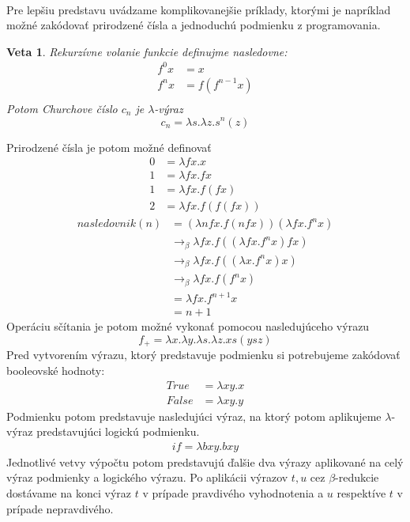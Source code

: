\documentclass[a4paper,10pt,oneside]{report}%
\newtheorem{theorem}{Veta}[chapter]
\begin{document}
~\\
    Pre lepšiu predstavu uvádzame komplikovanejšie príklady, ktorými je napríklad 
možné zakódovať prirodzené čísla a jednoduchú podmienku z programovania.
\begin{theorem}
    Rekurzívne volanie funkcie definujme nasledovne:
    \begin{align*}
        f^{0}x &= x \\
        f^{n}x &= f(f^{n-1}x) \\
    \end{align*}
    Potom Churchove číslo $c_{n}$ je $\lambda$-výraz
    \begin{equation*}
        c_{n} = \lambda s . \lambda z . s^{n} (z)
    \end{equation*}
\end{theorem}
    Prirodzené čísla je potom možné definovať
\begin{align*}
    0 &= \lambda f x . x \\
    1 &= \lambda f x . f x \\
    1 &= \lambda f x . f (f x) \\
    2 &= \lambda f x . f ( f (f x))
\end{align*}
\begin{align*}
    nasledovnik(n) &=           (\lambda n f x .  f( n f x ))(\lambda f x . f^{n} x) \\
                   &\to_{\beta} \lambda f x . f (( \lambda f x . f^{n} x ) f x)      \\
                   &\to_{\beta} \lambda f x . f (( \lambda x . f^{n} x) x)           \\
                   &\to_{\beta} \lambda f x . f (f^{n} x)                            \\
                   &=           \lambda f x . f^{n+1} x                              \\
                   &= n + 1
\end{align*}
    Operáciu sčítania je potom možné vykonať pomocou nasledujúceho výrazu
\begin{equation*}
    f_{+} = \lambda x. \lambda y. \lambda s. \lambda z. x s (y s z)
\end{equation*}
    Pred vytvorením výrazu, ktorý predstavuje podmienku si potrebujeme zakódovať
booleovské hodnoty:
    \begin{align*}
        True &= \lambda x y . x \\
        False &= \lambda x y . y
    \end{align*}
    Podmienku potom predstavuje nasledujúci výraz, na ktorý potom aplikujeme $\lambda$-výraz
predstavujúci logickú podmienku.
\begin{align*}
    if = \lambda b x y . b x y
\end{align*}
    Jednotlivé vetvy výpočtu potom predstavujú ďalšie dva výrazy aplikované na celý
výraz podmienky a logického výrazu.
    Po aplikácii výrazov $t,u$ cez $\beta$-redukcie dostávame na konci výraz $t$
v prípade pravdivého vyhodnotenia a $u$ respektíve $t$ v prípade nepravdivého.
\end{document}
